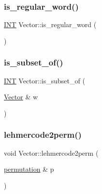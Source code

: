 \mbox{\label{class_vector_a40940c35a1c43919148b6ad176e21444}} 
\subsubsection{\texorpdfstring{is\+\_\+regular\+\_\+word()}{is\_regular\_word()}}
{\footnotesize\ttfamily \mbox{\hyperlink{galois_8h_a09fddde158a3a20bd2dcadb609de11dc}{I\+NT}} Vector\+::is\+\_\+regular\+\_\+word (\begin{DoxyParamCaption}{ }\end{DoxyParamCaption})}

\mbox{\label{class_vector_a984996de6448206b30f4e12f7021970d}} 
\subsubsection{\texorpdfstring{is\+\_\+subset\+\_\+of()}{is\_subset\_of()}}
{\footnotesize\ttfamily \mbox{\hyperlink{galois_8h_a09fddde158a3a20bd2dcadb609de11dc}{I\+NT}} Vector\+::is\+\_\+subset\+\_\+of (\begin{DoxyParamCaption}\item[{\mbox{\hyperlink{class_vector}{Vector}} \&}]{w }\end{DoxyParamCaption})}

\mbox{\label{class_vector_a6f2e3fb3d4105af914aa29c9be232161}} 
\subsubsection{\texorpdfstring{lehmercode2perm()}{lehmercode2perm()}}
{\footnotesize\ttfamily void Vector\+::lehmercode2perm (\begin{DoxyParamCaption}\item[{\mbox{\hyperlink{classpermutation}{permutation}} \&}]{p }\end{DoxyParamCaption})}

\mbox{\label{class_vector_aa6a97eabb43f192a47947f4f6acbb04d}} 
